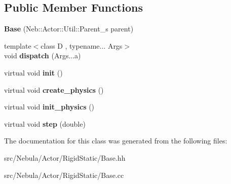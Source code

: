 \subsection*{\-Public \-Member \-Functions}
\begin{DoxyCompactItemize}
\item 
\hypertarget{classNeb_1_1Actor_1_1RigidStatic_1_1Base_aa940a28d87627c4dedade4259aed7945}{{\bfseries \-Base} (\-Neb\-::\-Actor\-::\-Util\-::\-Parent\-\_\-s parent)}\label{classNeb_1_1Actor_1_1RigidStatic_1_1Base_aa940a28d87627c4dedade4259aed7945}

\item 
\hypertarget{classNeb_1_1Actor_1_1RigidStatic_1_1Base_a8d411823ec5ea03ae498b6e838fcc46c}{{\footnotesize template$<$class D , typename... \-Args$>$ }\\void {\bfseries dispatch} (\-Args...\-a)}\label{classNeb_1_1Actor_1_1RigidStatic_1_1Base_a8d411823ec5ea03ae498b6e838fcc46c}

\item 
\hypertarget{classNeb_1_1Actor_1_1RigidStatic_1_1Base_acad1cbffa18417a84ce5eb2c71ba8195}{virtual void {\bfseries init} ()}\label{classNeb_1_1Actor_1_1RigidStatic_1_1Base_acad1cbffa18417a84ce5eb2c71ba8195}

\item 
\hypertarget{classNeb_1_1Actor_1_1RigidStatic_1_1Base_a23935f9d5a05d7f550d48781fd2dc8d0}{virtual void {\bfseries create\-\_\-physics} ()}\label{classNeb_1_1Actor_1_1RigidStatic_1_1Base_a23935f9d5a05d7f550d48781fd2dc8d0}

\item 
\hypertarget{classNeb_1_1Actor_1_1RigidStatic_1_1Base_a35c1b98697826f6224b4457315aeb2f3}{virtual void {\bfseries init\-\_\-physics} ()}\label{classNeb_1_1Actor_1_1RigidStatic_1_1Base_a35c1b98697826f6224b4457315aeb2f3}

\item 
\hypertarget{classNeb_1_1Actor_1_1RigidStatic_1_1Base_adc86ba48b33b433f8302360a62565ca7}{virtual void {\bfseries step} (double)}\label{classNeb_1_1Actor_1_1RigidStatic_1_1Base_adc86ba48b33b433f8302360a62565ca7}

\end{DoxyCompactItemize}


\-The documentation for this class was generated from the following files\-:\begin{DoxyCompactItemize}
\item 
src/\-Nebula/\-Actor/\-Rigid\-Static/\-Base.\-hh\item 
src/\-Nebula/\-Actor/\-Rigid\-Static/\-Base.\-cc\end{DoxyCompactItemize}
